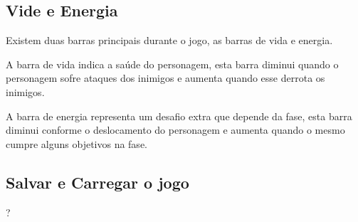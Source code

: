 \subsection {Vide e Energia}

Existem duas barras principais durante o jogo, as barras de vida e energia. 

A barra de vida indica a saúde do personagem, esta barra diminui quando
o personagem sofre ataques dos inimigos e aumenta quando esse derrota os inimigos.

A barra de energia representa um desafio extra que depende da fase, esta barra diminui conforme o deslocamento do personagem e aumenta quando o 
mesmo cumpre alguns objetivos na fase.

\subsection {Salvar e Carregar o jogo}
?